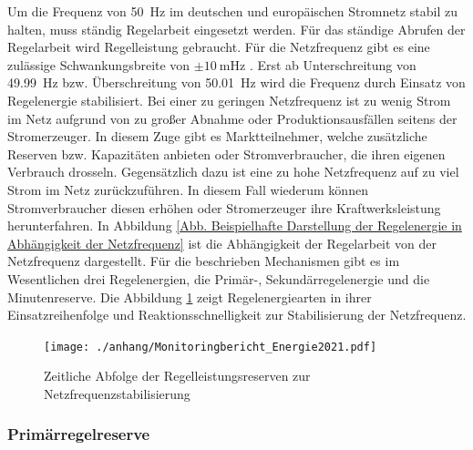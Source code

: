 		Um die Frequenz von \SI{50}{\hertz} im deutschen und europäischen Stromnetz stabil zu halten, muss ständig Regelarbeit eingesetzt werden.
		Für das ständige Abrufen der Regelarbeit wird Regelleistung gebraucht.
		Für die Netzfrequenz gibt es eine zulässige Schwankungsbreite von $\pm\SI{10}{\milli\hertz}$ \parencite{Angerer_Krohns}.
		Erst ab Unterschreitung von \SI{49,99}{\hertz} bzw. Überschreitung von \SI{50,01}{\hertz} wird die Frequenz durch Einsatz von Regelenergie stabilisiert.
		Bei einer zu geringen Netzfrequenz ist zu wenig Strom im Netz aufgrund von zu großer Abnahme oder Produktionsausfällen seitens der Stromerzeuger.
		In diesem Zuge gibt es Marktteilnehmer, welche zusätzliche Reserven bzw. Kapazitäten anbieten oder Stromverbraucher, die ihren eigenen Verbrauch drosseln.
		Gegensätzlich dazu ist eine zu hohe Netzfrequenz auf zu viel Strom im Netz zurückzuführen. 
		In diesem Fall wiederum können Stromverbraucher diesen erhöhen oder Stromerzeuger ihre Kraftwerksleistung herunterfahren. 
		In Abbildung \ref{Abb. Beispielhafte Darstellung der Regelenergie in Abhängigkeit der Netzfrequenz} ist die Abhängigkeit der Regelarbeit von der Netzfrequenz dargestellt.
		Für die beschrieben Mechanismen gibt es im Wesentlichen drei Regelenergien, die Primär-, Sekundärregelenergie und die Minutenreserve.
		Die Abbildung \ref{Abb. Reaktionskette Regelenergien} zeigt Regelenergiearten in ihrer Einsatzreihenfolge und Reaktionsschnelligkeit zur Stabilisierung der Netzfrequenz. 
		
		\begin{figure} [H]
			\centering
			\label{Abb. Reaktionskette Regelenergien}
			\texttt{[image: ./anhang/Monitoringbericht\_Energie2021.pdf]}
			\caption{Zeitliche Abfolge der Regelleistungsreserven zur Netzfrequenzstabilisierung \parencite{Elektrizitätswirtschaft}}
		\end{figure}
		
		\subsubsection{Primärregelreserve} \label{sect: Primärregelreserve}
		
